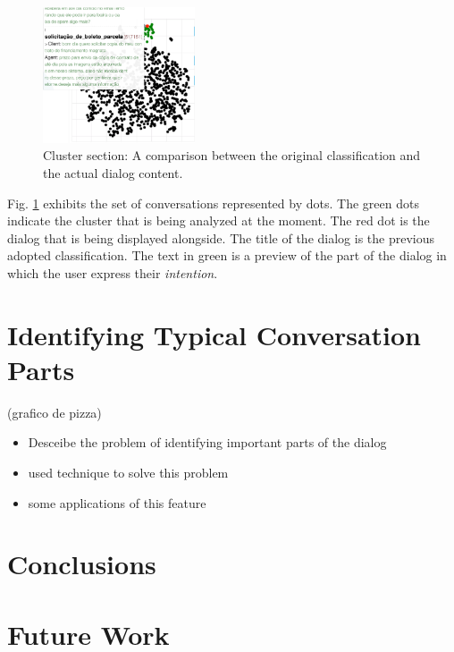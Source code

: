 \documentclass[11pt,a4paper]{article}
\begin{document}
\begin{figure}[ht!]
    \centering
    \includegraphics[width=0.4\textwidth]{figures/clustering_section.png}
    \caption{Cluster section: A comparison between the original classification and the actual dialog content.}
    \label{fig:cluster}
\end{figure}

Fig. \ref{fig:cluster} exhibits the set of conversations represented by dots. The green dots indicate the cluster that is being analyzed at the moment. The red dot is the dialog that is being displayed alongside. The title of the dialog is the previous adopted classification. The text in green is a preview of the part of the dialog in which the user express their \textit{intention}.  

\section{Identifying Typical Conversation Parts}

(grafico de pizza)
\begin{itemize}
    \item Desceibe the problem of identifying important parts of the dialog
    \item used technique to solve this problem
    \item some applications of this feature
\end{itemize}


\section{Conclusions}

\section{Future Work}




\end{document}
